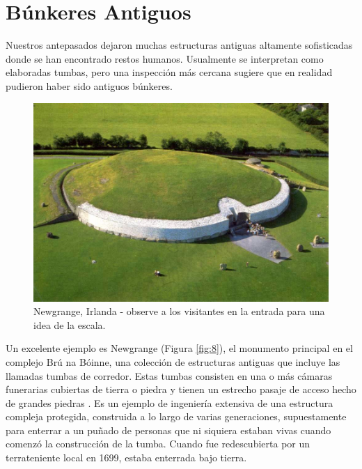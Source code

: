 \documentclass[10pt,twocolumn,letterpaper]{article}
\begin{document}
\section{Búnkeres Antiguos}

Nuestros antepasados dejaron muchas estructuras antiguas altamente sofisticadas donde se han encontrado restos humanos. Usualmente se interpretan como elaboradas tumbas, pero una inspección más cercana sugiere que en realidad pudieron haber sido antiguos búnkeres.

\begin{figure}[t]
\begin{center}
   \includegraphics[width=1\linewidth]{ww19.jpg}
\end{center}
   \caption{Newgrange, Irlanda - observe a los visitantes en la entrada para una idea de la escala.}
\label{fig:8}
\label{fig:onecol}
\end{figure}

Un excelente ejemplo es Newgrange (Figura \ref{fig:8}), el monumento principal en el complejo Brú na Bóinne, una colección de estructuras antiguas que incluye las llamadas tumbas de corredor. Estas tumbas consisten en una o más cámaras funerarias cubiertas de tierra o piedra y tienen un estrecho pasaje de acceso hecho de grandes piedras \cite{70}. Es un ejemplo de ingeniería extensiva de una estructura compleja protegida, construida a lo largo de varias generaciones, supuestamente para enterrar a un puñado de personas que ni siquiera estaban vivas cuando comenzó la construcción de la tumba. Cuando fue redescubierta por un terrateniente local en 1699, estaba enterrada bajo tierra.
\end{document}
